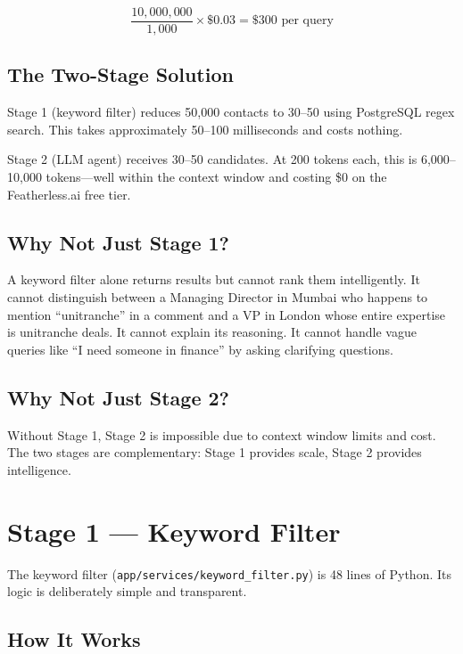\documentclass[12pt, a4paper]{report}
\begin{document}
\[
\frac{10,000,000}{1,000} \times \$0.03 = \$300 \text{ per query}
\]

\subsection{The Two-Stage Solution}

Stage 1 (keyword filter) reduces 50,000 contacts to 30--50 using PostgreSQL regex search. This takes approximately 50--100 milliseconds and costs nothing.

Stage 2 (LLM agent) receives 30--50 candidates. At 200 tokens each, this is 6,000--10,000 tokens---well within the context window and costing \$0 on the Featherless.ai free tier.

\subsection{Why Not Just Stage 1?}

A keyword filter alone returns results but cannot rank them intelligently. It cannot distinguish between a Managing Director in Mumbai who happens to mention ``unitranche'' in a comment and a VP in London whose entire expertise is unitranche deals. It cannot explain its reasoning. It cannot handle vague queries like ``I need someone in finance'' by asking clarifying questions.

\subsection{Why Not Just Stage 2?}

Without Stage 1, Stage 2 is impossible due to context window limits and cost. The two stages are complementary: Stage 1 provides scale, Stage 2 provides intelligence.

\section{Stage 1 --- Keyword Filter}

The keyword filter (\texttt{app/services/keyword\_filter.py}) is 48 lines of Python. Its logic is deliberately simple and transparent.

\subsection{How It Works}
\end{document}
